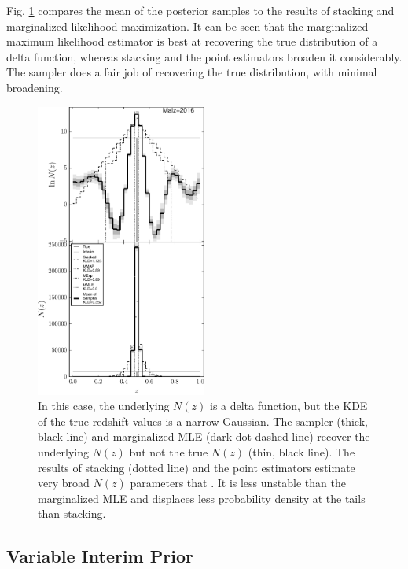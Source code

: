 \documentclass[preprint]{aastex}
\begin{document}
Fig. \ref{fig:toy-comp} compares the mean of the posterior samples to the 
results of stacking and marginalized likelihood maximization.  It can be seen 
that the marginalized maximum likelihood estimator is best at recovering the 
true distribution of a delta function, whereas stacking and the point 
estimators broaden it considerably.  The sampler does a fair job of recovering 
the true distribution, with minimal broadening.


\begin{figure}
\includegraphics[width=0.5\textwidth]{figs/delt/comps.pdf}
\caption{In this case, the underlying $N(z)$ is a delta function, but the KDE 
of the true redshift values is a narrow Gaussian.  The sampler (thick, black 
line) and marginalized MLE (dark dot-dashed line) recover the underlying $N(z)$ 
but not the true $N(z)$ (thin, black line).  The results of stacking (dotted 
line) and the point estimators estimate very broad $N(z)$ parameters that .  It 
is less unstable than the marginalized MLE and displaces less probability 
density at the tails than stacking.}
\label{fig:toy-comp}
\end{figure}

\clearpage
\subsection{Variable Interim Prior}
\label{sec:interim}
\end{document}
